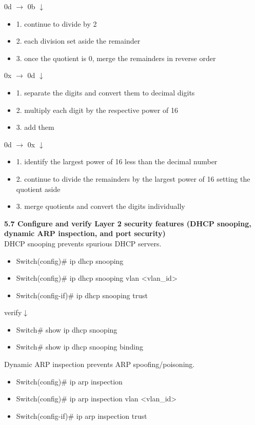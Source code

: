 \documentclass{article}
\begin{document}
0d $\rightarrow$ 0b $\downarrow$
\begin{itemize}
\item 1. continue to divide by 2
\item 2. each division set aside the remainder
\item 3. once the quotient is 0, merge the remainders in reverse order
\end{itemize}
		
0x $\rightarrow$ 0d $\downarrow$
\begin{itemize}
\item 1. separate the digits and convert them to decimal digits
\item 2. multiply each digit by the respective power of 16
\item 3. add them
\end{itemize}
	
0d $\rightarrow$ 0x $\downarrow$
\begin{itemize}
\item 1. identify the largest power of 16 less than the decimal number
\item 2. continue to divide the remainders by the largest power of 16 setting the quotient aside
\item 3. merge quotients and convert the digits individually
\end{itemize}
		
\textbf{5.7 Configure and verify Layer 2 security features (DHCP snooping, dynamic ARP inspection, and port security)}\\

DHCP snooping prevents spurious DHCP servers.
\begin{itemize}
\item Switch(config)\# ip dhcp snooping
\item Switch(config)\# ip dhcp snooping vlan \textless vlan\_id\textgreater
\item Switch(config-if)\# ip dhcp snooping trust
\end{itemize}
		
verify$\downarrow$
\begin{itemize}
\item Switch\# show ip dhcp snooping
\item Switch\# show ip dhcp snooping binding
\end{itemize}
		
Dynamic ARP inspection prevents ARP spoofing/poisoning.
\begin{itemize}
\item Switch(config)\# ip arp inspection
\item Switch(config)\# ip arp inspection vlan \textless vlan\_id\textgreater
\item Switch(config-if)\# ip arp inspection trust
\end{itemize}
		
\end{document}
